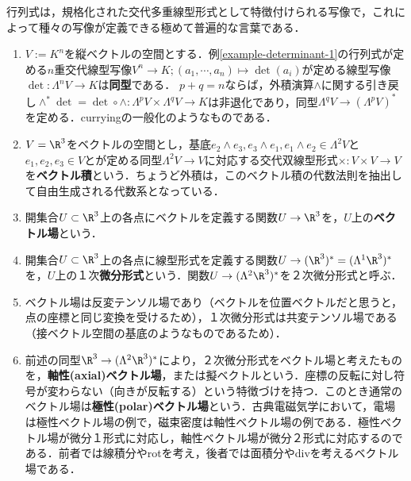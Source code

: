 \documentclass[uplatex, dvipdfmx]{jsreport}
\begin{document}
\begin{example}[行列式の射程]
    行列式は，規格化された交代多重線型形式として特徴付けられる写像で，これによって種々の写像が定義できる極めて普遍的な言葉である．
    \begin{enumerate}
        \item $V:=K^n$を縦ベクトルの空間とする．例\ref{example-determinant-1}の行列式が定める$n$重交代線型写像$V^{n}\to K;(a_1,\cdots,a_n)\mapsto\det(a_i)$が定める線型写像$\det:\Lambda^nV\to K$は\textbf{同型}である．
        $p+q=n$ならば，外積演算$\wedge$に関する引き戻し$\wedge^*\det=\det\circ\wedge:\Lambda^pV\times\Lambda^qV\to K$は非退化であり，同型$\Lambda^qV\to(\Lambda^pV)^*$を定める．curryingの一般化のようなものである．
        \item $V=\R^3$をベクトルの空間とし，基底$e_2\wedge e_3,e_3\wedge e_1,e_1\wedge e_2\in\Lambda^2V$と$e_1,e_2,e_3\in V$とが定める同型$\Lambda^2V\to V$に対応する交代双線型形式$\times:V\times V\to V$を\textbf{ベクトル積}という．ちょうど外積は，このベクトル積の代数法則を抽出して自由生成される代数系となっている．
        \item 開集合$U\subset\R^3$上の各点にベクトルを定義する関数$U\to\R^3$を，$U$上の\textbf{ベクトル場}という．
        \item 開集合$U\subset\R^3$上の各点に線型形式を定義する関数$U\to(\R^3)^*=(\Lambda^1\R^3)^*$を，$U$上の１次\textbf{微分形式}という．関数$U\to(\Lambda^2\R^3)^*$を２次微分形式と呼ぶ．
        \item ベクトル場は反変テンソル場であり（ベクトルを位置ベクトルだと思うと，点の座標と同じ変換を受けるため），１次微分形式は共変テンソル場である（接ベクトル空間の基底のようなものであるため）．
        \item 前述の同型$\R^3\to(\Lambda^2\R^3)^*$により，２次微分形式をベクトル場と考えたものを，\textbf{軸性(axial)ベクトル場}，または擬ベクトルという．座標の反転に対し符号が変わらない（向きが反転する）という特徴づけを持つ．このとき通常のベクトル場は\textbf{極性(polar)ベクトル場}という．古典電磁気学において，電場は極性ベクトル場の例で，磁束密度は軸性ベクトル場の例である．極性ベクトル場が微分１形式に対応し，軸性ベクトル場が微分２形式に対応するのである．前者では線積分やrotを考え，後者では面積分やdivを考えるベクトル場である．
    \end{enumerate}
\end{example}
\end{document}
